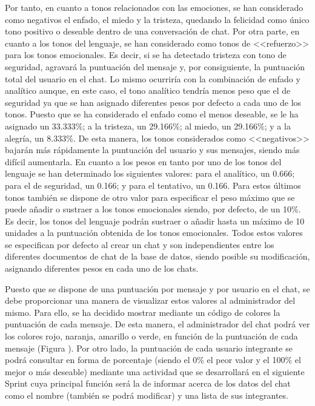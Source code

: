 Por tanto, en cuanto a tonos relacionados con las emociones, se han considerado como negativos el enfado, el miedo y la tristeza, quedando la felicidad como único tono positivo o deseable dentro de una conversación de chat. Por otra parte, en cuanto a los tonos del lenguaje, se han considerado como tonos de <<refuerzo>> para los tonos emocionales. Es decir, si se ha detectado tristeza con tono de seguridad, agravará la puntuación del mensaje y, por consiguiente, la puntuación total del usuario en el chat. Lo mismo ocurriría con la combinación de enfado y analítico aunque, en este caso, el tono analítico tendría menos peso que el de seguridad ya que se han asignado diferentes pesos por defecto a cada uno de los tonos. Puesto que se ha considerado el enfado como el menos deseable, se le ha asignado un 33.333\%; a la tristeza, un 29.166\%; al miedo, un 29.166\%; y a la alegría, un 8.333\%. De esta manera, los tonos considerados como <<negativos>> bajarán más rápidamente la puntuación del usuario y sus mensajes, siendo más difícil aumentarla. En cuanto a los pesos en tanto por uno de los tonos del lenguaje se han determinado los siguientes valores: para el analítico, un 0.666; para el de seguridad, un 0.166; y para el tentativo, un 0.166. Para estos últimos tonos también se dispone de otro valor para especificar el peso máximo que se puede añadir o sustraer a los tonos emocionales siendo, por defecto, de un 10\%. Es decir, los tonos del lenguaje podrán sustraer o añadir hasta un máximo de 10 unidades a la puntuación obtenida de los tonos emocionales. Todos estos valores se especifican por defecto al crear un chat y son independientes entre los diferentes documentos de chat de la base de datos, siendo posible su modificación, asignando diferentes pesos en cada uno de los chats.

Puesto que se dispone de una puntuación por mensaje y por usuario en el chat, se debe proporcionar una manera de visualizar estos valores al administrador del mismo. Para ello, se ha decidido mostrar mediante un código de colores la puntuación de cada mensaje. De esta manera, el administrador del chat podrá ver los colores rojo, naranja, amarillo o verde, en función de la puntuación de cada mensaje (Figura ). Por otro lado, la puntuación de cada usuario integrante se podrá consultar en forma de porcentaje (siendo el 0\% el peor valor y el 100\% el mejor o más deseable) mediante una actividad que se desarrollará en el siguiente Sprint cuya principal función será la de informar acerca de los datos del chat como el nombre (también se podrá modificar) y una lista de sus integrantes.

